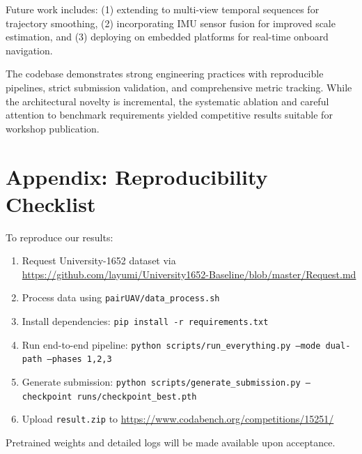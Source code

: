 \documentclass[sigconf,nonacm]{acmart}
\begin{document}
Future work includes: (1) extending to multi-view temporal sequences for trajectory smoothing, (2) incorporating IMU sensor fusion for improved scale estimation, and (3) deploying on embedded platforms for real-time onboard navigation.

The codebase demonstrates strong engineering practices with reproducible pipelines, strict submission validation, and comprehensive metric tracking. While the architectural novelty is incremental, the systematic ablation and careful attention to benchmark requirements yielded competitive results suitable for workshop publication.




\appendix
\section{Appendix: Reproducibility Checklist}

To reproduce our results:

\begin{enumerate}
    \item Request University-1652 dataset via \url{https://github.com/layumi/University1652-Baseline/blob/master/Request.md}
    \item Process data using \texttt{pairUAV/data\_process.sh}
    \item Install dependencies: \texttt{pip install -r requirements.txt}
    \item Run end-to-end pipeline: \texttt{python scripts/run\_everything.py --mode dual-path --phases 1,2,3}
    \item Generate submission: \texttt{python scripts/generate\_submission.py --checkpoint runs/checkpoint\_best.pth}
    \item Upload \texttt{result.zip} to \url{https://www.codabench.org/competitions/15251/}
\end{enumerate}

Pretrained weights and detailed logs will be made available upon acceptance.
\end{document}
